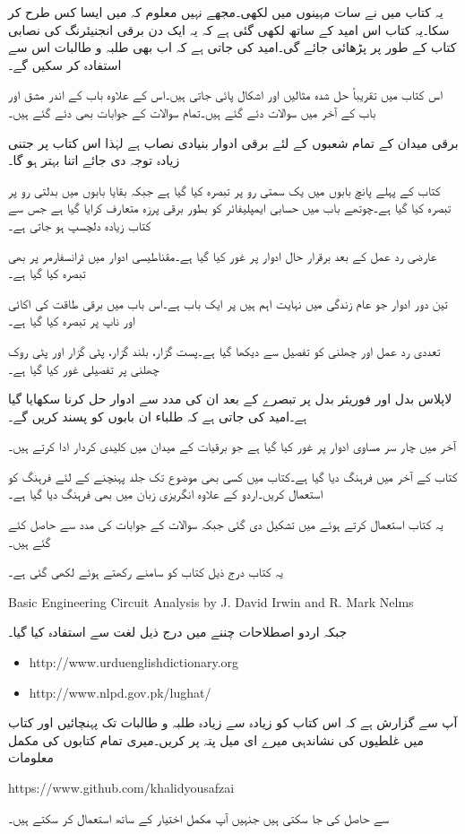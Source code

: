 یہ کتاب میں نے سات مہینوں میں لکھی۔مجھے نہیں معلوم کہ میں ایسا کس طرح کر سکا۔یہ کتاب اس امید کے ساتھ لکھی گئی ہے کہ یہ ایک دن برقی انجنیئرنگ کی نصابی کتاب کے طور پر پڑھائی جائے گی۔امید کی جاتی ہے کہ اب بھی طلبہ و طالبات اس سے استفادہ کر سکیں گے۔


اس کتاب میں تقریباً  حل شدہ مثالیں اور  اشکال پائی جاتی ہیں۔اس کے علاوہ باب کے اندر  مشق اور باب کے آخر میں  سوالات دئے گئے ہیں۔تمام سوالات کے جوابات بھی دئے گئے ہیں۔

برقی میدان کے تمام شعبوں کے لئے برقی ادوار بنیادی نصاب ہے لہٰذا اس کتاب پر جتنی زیادہ توجہ دی جائے اتنا بہتر ہو گا۔

کتاب کے پہلے پانچ بابوں میں یک سمتی رو پر تبصرہ کیا گیا ہے جبکہ بقایا بابوں میں بدلتی رو پر تبصرہ کیا گیا ہے۔چوتھے باب میں حسابی ایمپلیفائر کو بطور برقی پرزہ متعارف کرایا گیا ہے جس سے  کتاب زیادہ دلچسپ ہو جاتی ہے۔  

عارضی رد عمل کے بعد برقرار حال ادوار پر غور کیا گیا ہے۔مقناطیسی ادوار میں ٹرانسفارمر پر بھی تبصرہ کیا گیا ہے۔

تین دور ادوار جو عام زندگی میں نہایت اہم ہیں پر ایک باب ہے۔اس باب میں برقی طاقت کی اکائی اور ناپ پر تبصرہ کیا گیا ہے۔
 

تعددی رد عمل اور چھلنی کو تفصیل سے دیکھا گیا ہے۔پست گزار، بلند گزار، پٹی گزار اور پٹی روک چھلنی پر تفصیلی غور کیا گیا ہے۔

لاپلاس بدل اور فوریئر بدل پر تبصرے کے بعد ان کی مدد سے ادوار حل کرنا سکھایا گیا ہے۔امید کی جاتی ہے کہ طلباء ان بابوں کو پسند کریں گے۔

آخر میں چار سر مساوی ادوار پر غور کیا گیا ہے جو برقیات کے میدان میں کلیدی کردار ادا کرتے ہیں۔

کتاب کے آخر میں فرہنگ دیا گیا ہے۔کتاب میں کسی بھی موضوع تک جلد پہنچنے کے لئے فرہنگ کو استعمال کریں۔اردو کے علاوہ انگریزی زبان میں بھی فرہنگ دیا گیا ہے۔

یہ کتاب  استعمال کرتے ہوئے  میں تشکیل دی گئی جبکہ سوالات کے جوابات  کی مدد سے حاصل کئے گئے ہیں۔

یہ کتاب درج ذیل کتاب کو سامنے رکھتے ہوئے لکھی گئی ہے۔

{
\begin{otherlanguage}{english}
Basic Engineering Circuit Analysis by J. David Irwin and R. Mark Nelms
\end{otherlanguage}
}

جبکہ اردو اصطلاحات چننے میں درج ذیل لغت سے استفادہ  کیا گیا۔
{
\begin{otherlanguage}{english}
\begin{itemize}
\item
http:/\!\!/www.urduenglishdictionary.org
\item
http:/\!\!/www.nlpd.gov.pk/lughat/
\end{itemize}
\end{otherlanguage}
}
آپ سے گزارش ہے کہ اس کتاب کو زیادہ سے زیادہ طلبہ و طالبات تک پہنچائیں اور کتاب میں غلطیوں کی نشاندہی میرے  ای میل پتہ پر کریں۔میری تمام کتابوں کی مکمل  معلومات

{
\begin{otherlanguage}{english}
https:/\!\!/www.github.com/khalidyousafzai
\end{otherlanguage}
}

سے حاصل کی جا سکتی ہیں جنہیں آپ مکمل اختیار کے ساتھ استعمال کر سکتے ہیں۔
\vspace{5mm}

{}


